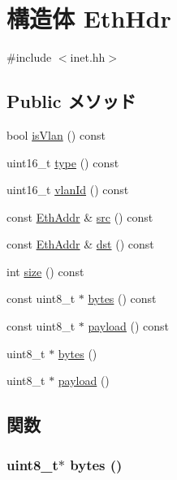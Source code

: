 \hypertarget{structNet_1_1EthHdr}{
\section{構造体 EthHdr}
\label{structNet_1_1EthHdr}
}


{\ttfamily \#include $<$inet.hh$>$}\subsection*{Public メソッド}
\begin{DoxyCompactItemize}
\item 
bool \hyperlink{structNet_1_1EthHdr_ab77c052e3da73dead20179a30fe14546}{isVlan} () const 
\item 
uint16\_\-t \hyperlink{structNet_1_1EthHdr_a236542f3042d3c2ac7d98d1a7ad75269}{type} () const 
\item 
uint16\_\-t \hyperlink{structNet_1_1EthHdr_afc72e33f3356269c9ff905dfc17ed070}{vlanId} () const 
\item 
const \hyperlink{structNet_1_1EthAddr}{EthAddr} \& \hyperlink{structNet_1_1EthHdr_a51749901bf4eabf2967325c9b4482d35}{src} () const 
\item 
const \hyperlink{structNet_1_1EthAddr}{EthAddr} \& \hyperlink{structNet_1_1EthHdr_a69ca058eabf9eab6f3aba644b89a65e0}{dst} () const 
\item 
int \hyperlink{structNet_1_1EthHdr_ab8e4e3e2a7bf18888b71bdf9dda0770b}{size} () const 
\item 
const uint8\_\-t $\ast$ \hyperlink{structNet_1_1EthHdr_aaa586eeaf354005403ca8e20f961b6c3}{bytes} () const 
\item 
const uint8\_\-t $\ast$ \hyperlink{structNet_1_1EthHdr_a5f0d069ddb9d067af9e94963bd1fc7a2}{payload} () const 
\item 
uint8\_\-t $\ast$ \hyperlink{structNet_1_1EthHdr_add4fb6fe45a091194dc9eac521194698}{bytes} ()
\item 
uint8\_\-t $\ast$ \hyperlink{structNet_1_1EthHdr_a79ce21e3572e587b71de7af1ac640b6f}{payload} ()
\end{DoxyCompactItemize}


\subsection{関数}
\hypertarget{structNet_1_1EthHdr_add4fb6fe45a091194dc9eac521194698}{
\subsubsection[{bytes}]{\setlength{\rightskip}{0pt plus 5cm}uint8\_\-t$\ast$ bytes ()}}
\label{structNet_1_1EthHdr_add4fb6fe45a091194dc9eac521194698}



